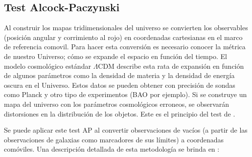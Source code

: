 \documentclass[preprint]{aastex62}
\begin{document}
  \subsection{Test Alcock-Paczynski}
  Al construir los mapas tridimensionales del universo se convierten los observables (posición
  angular y corrimiento al rojo) en coordenadas cartesianas en el marco de referencia comovil.
  Para hacer esta conversión es necesario conocer la métrica de nuestro Universo; cómo se
  expande el espacio en función del tiempo. El modelo cosmológico estándar $\Lambda$CDM
  describe esta rata de expansión en función de algunos parámetros como la densidad de materia
  y la densidad de energía oscura en el Universo. Estos datos se pueden obtener con precisión
  de sondas como Planck y otro tipo de experimentos (BAO por ejemplo). Si se construye un mapa
  del universo con los parámetros cosmológicos erroneos, se observarán
  distorsiones en la distribución de los objetos. Este es el principio del test de
  \citet{AlcockPaczynski1979}.

  Se puede aplicar este test AP al convertir observaciones de
  vacíos (a partir de las observaciones de galaxias como marcadores de sus límites) a coordenadas
  comóviles. Una descripción detallada de esta metodología se brinda en \citet{Hamaus2015}:
\end{document}
